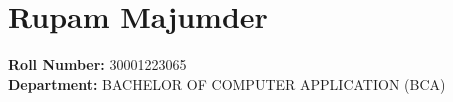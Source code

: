 \section*{Rupam Majumder}
\textbf{Roll Number:} 30001223065 \\
\textbf{Department:} BACHELOR OF COMPUTER APPLICATION (BCA)


